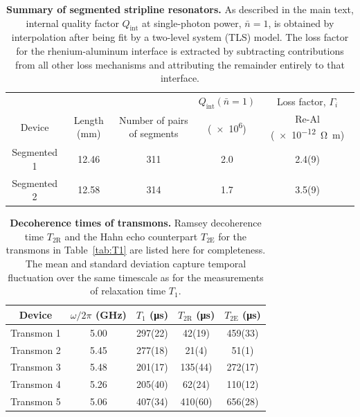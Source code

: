 \documentclass[
    reprint,
    superscriptaddress,
    amsmath,amssymb,
    aps,
    prb,
    floatfix,
]{revtex4-2}
\begin{document}
\begin{table}
    \begin{ruledtabular}
    \begin{tabular}{
        c
        S[table-format=2.2]
        S[table-format=3]
        S[table-format=1.1]
        S[table-format=1.1(1.1)]
    }
        &
        &
        & {$Q_\mathrm{int}\left(\bar{n}=1\right)$}
        & {Loss factor, $\Gamma_i$} \\
        Device
        & {Length (\si{\milli\meter})}
        & {Number of pairs of segments}
        & {(\num{e6})}
        & {Re-Al (\SI{e-12}{\ohm\meter})} \\
        \midrule
        Segmented 1 & 12.46 & 311 & 2.0 & 2.4(9) \\
        Segmented 2 & 12.58 & 314 & 1.7 & 3.5(9) \\
    \end{tabular}
    \end{ruledtabular}
    \caption{\label{tab:segmented} \textbf{Summary of segmented stripline resonators.} As described in the main text, internal quality factor $Q_\mathrm{int}$ at single-photon power, $\bar{n}=1$, is obtained by interpolation after being fit by a two-level system (TLS) model. The loss factor for the rhenium-aluminum interface is extracted by subtracting contributions from all other loss mechanisms and attributing the remainder entirely to that interface.}
\end{table}

\begin{table}
    \begin{ruledtabular}
    \begin{tabular}{
        c
        S[table-format=1.2]
        S[table-format=3(2)]
        S[table-format=3(2)]
        S[table-format=3(2)]
    }
         Device
         & {$\omega/2\pi$ (\si{\giga\hertz})}
         & {$T_1$ (\si{\micro\second})}
         & {$T_{2\mathrm{R}}$ (\si{\micro\second})}
         & {$T_{2\mathrm{E}}$ (\si{\micro\second})} \\
         \midrule
         Transmon 1 & 5.00 & 297(22) &  42(19) & 459(33) \\
         Transmon 2 & 5.45 & 277(18) &   21(4) &   51(1) \\
         Transmon 3 & 5.48 & 201(17) & 135(44) & 272(17) \\
         Transmon 4 & 5.26 & 205(40) &  62(24) & 110(12) \\
         Transmon 5 & 5.06 & 407(34) & 410(60) & 656(28) \\
    \end{tabular}
    \end{ruledtabular}
    \caption{\label{tab:transmon} \textbf{Decoherence times of transmons.} Ramsey decoherence time $T_{2\mathrm{R}}$ and the Hahn echo counterpart $T_{2\mathrm{E}}$ for the transmons in Table~\ref{tab:T1} are listed here for completeness. The mean and standard deviation capture temporal fluctuation over the same timescale as for the measurements of relaxation time $T_1$.}
\end{table}

\clearpage


\end{document}
